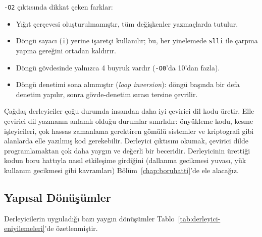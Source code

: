 \begin{ornek}[4.16]
\texttt{-O2} çıktısında dikkat çeken farklar:
\begin{itemize}
\item Yığıt çerçevesi oluşturulmamıştır, tüm değişkenler yazmaçlarda tutulur.
\item Döngü sayacı (\texttt{i}) yerine işaretçi kullanılır; bu, her yinelemede \texttt{slli} ile çarpma yapma gereğini ortadan kaldırır.
\item Döngü gövdesinde yalnızca 4 buyruk vardır (\texttt{-O0}'da 10'dan fazla).
\item Döngü denetimi sona alınmıştır (\emph{loop inversion}): döngü başında bir defa denetim yapılır, sonra gövde-denetim sırası tersine çevrilir.
\end{itemize}
\end{ornek}

\begin{bilginot}
Çağdaş derleyiciler çoğu durumda insandan daha iyi çevirici dil kodu üretir. Elle çevirici dil yazmanın anlamlı olduğu durumlar sınırlıdır: önyükleme kodu, kesme işleyicileri, çok hassas zamanlama gerektiren gömülü sistemler ve kriptografi gibi alanlarda elle yazılmış kod gerekebilir. Derleyici çıktısını okumak, çevirici dilde programlamaktan çok daha yaygın ve değerli bir beceridir. Derleyicinin ürettiği kodun boru hattıyla nasıl etkileşime girdiğini (dallanma gecikmesi yuvası, yük kullanım gecikmesi gibi kavramları) Bölüm~\ref{chap:boruhatti}'de ele alacağız.
\end{bilginot}


\subsection{Yapısal Dönüşümler}
\label{subsec:yapisal-donusumler}

Derleyicilerin uyguladığı bazı yaygın dönüşümler Tablo~\ref{tab:derleyici-eniyilemeleri}'de özetlenmiştir.

